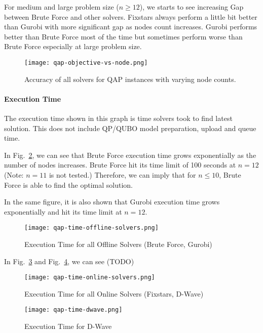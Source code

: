 \documentclass[conference]{IEEEtran}
\begin{document}
For medium and large problem size ($n \ge 12$), we starts to see increasing Gap between Brute Force and other solvers. Fixstars always perform a little bit better than Gurobi with more significant gap as nodes count increases. Gurobi performs better than Brute Force most of the time but sometimes perform worse than Brute Force especially at large problem size.

\begin{figure}[htbp]
\centerline{\texttt{[image: qap-objective-vs-node.png]}}
\caption{Accuracy of all solvers for QAP instances with varying node counts.}
\label{fig_qap_accuracy}
\end{figure}

\paragraph{Execution Time}

The execution time shown in this graph is time solvers took to find latest solution. This does not include QP/QUBO model preparation, upload and queue time.

In Fig.~\ref{fig_qap_time_offline}, we can see that Brute Force execution time grows exponentially as the number of nodes increases. Brute Force hit its time limit of 100 seconds at $n = 12$ (Note: $n = 11$ is not tested.) Therefore, we can imply that for $n \le 10$, Brute Force is able to find the optimal solution.

In the same figure, it is also shown that Gurobi execution time grows exponentially and hit its time limit at $n = 12$.

\begin{figure}[htbp]
\centerline{\texttt{[image: qap-time-offline-solvers.png]}}
\caption{Execution Time for all Offline Solvers (Brute Force, Gurobi)}
\label{fig_qap_time_offline}
\end{figure}

In Fig.~\ref{fig_qap_time_online} and Fig.~\ref{fig_qap_time_dwave}, we can see (TODO)

\begin{figure}[htbp]
\centerline{\texttt{[image: qap-time-online-solvers.png]}}
\caption{Execution Time for all Online Solvers (Fixstars, D-Wave)}
\label{fig_qap_time_online}
\end{figure}

\begin{figure}[htbp]
\centerline{\texttt{[image: qap-time-dwave.png]}}
\caption{Execution Time for D-Wave}
\label{fig_qap_time_dwave}
\end{figure}
\end{document}
